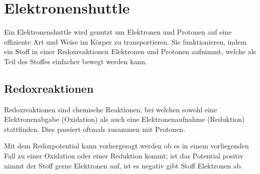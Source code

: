 \documentclass{article}
\begin{document}
\section{Elektronenshuttle}
Ein Elektronenshuttle wird genutzt um Elektronen und Protonen auf eine effiziente Art und Weise im Körper zu transportieren. Sie funktionieren, indem ein Stoff in einer Redoxreaktionen Elektronen und Protonen aufnimmt, welche als Teil des Stoffes einfacher bewegt werden kann.
\subsection{Redoxreaktionen}
Redoxreaktionen sind chemische Reaktionen, bei welchen sowohl eine Elektronenabgabe (Oxidation) als auch eine Elektronenaufnahme (Reduktion) stattfinden.
Dies passiert oftmals zusammen mit Protonen.

Mit dem Redoxpotential kann vorhergesagt werden ob es in einem vorliegenden Fall zu einer Oxidation oder einer Reduktion kommt; ist das Potential positiv nimmt der Stoff gerne Elektronen auf, ist es negativ gibt Stoff Elektronen ab.
 
\end{document}
